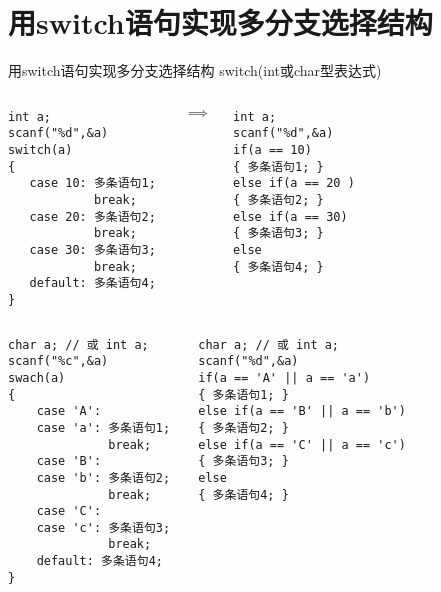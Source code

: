\section{用switch语句实现多分支选择结构}

\begin{frame}{用switch语句实现多分支选择结构}
switch(int或char型表达式)
\begin{columns}[T]
\begin{lstlisting}
int a;
scanf("%d",&a)
switch(a)
{
   case 10: 多条语句1; 
            break;
   case 20: 多条语句2; 
            break;
   case 30: 多条语句3; 
            break;
   default: 多条语句4;
}
\end{lstlisting}
\vspace{3cm}
$\implies$
\begin{lstlisting}
int a;
scanf("%d",&a)
if(a == 10)
{ 多条语句1; } 
else if(a == 20 )
{ 多条语句2; } 
else if(a == 30) 
{ 多条语句3; }
else
{ 多条语句4; }
\end{lstlisting}
\end{columns}
\end{frame}

\begin{frame}
\begin{columns}[T]
\begin{lstlisting}
char a; // 或 int a;
scanf("%c",&a)
swach(a)
{
    case 'A':
    case 'a': 多条语句1; 
              break;
    case 'B':
    case 'b': 多条语句2; 
              break;
    case 'C':
    case 'c': 多条语句3; 
              break;
    default: 多条语句4;
}
\end{lstlisting}
\begin{lstlisting}	
char a; // 或 int a;
scanf("%d",&a)
if(a == 'A' || a == 'a')
{ 多条语句1; } 
else if(a == 'B' || a == 'b')
{ 多条语句2; } 
else if(a == 'C' || a == 'c') 
{ 多条语句3; }
else
{ 多条语句4; }
\end{lstlisting}
\end{columns}
\end{frame}

